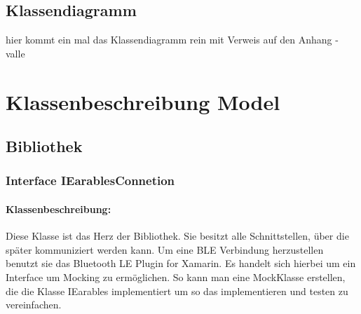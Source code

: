 \documentclass[a4paper,12pt]{article}
\begin{document}
  \subsection{Klassendiagramm}
hier kommt ein mal das Klassendiagramm rein mit Verweis auf den Anhang - valle
\clearpage
\section{Klassenbeschreibung Model}
\subsection{Bibliothek}
\subsubsection{Interface IEarablesConnetion}

\paragraph{Klassenbeschreibung:}
Diese Klasse ist das Herz der Bibliothek. Sie besitzt alle Schnittstellen, über die später kommuniziert werden kann. Um eine BLE Verbindung herzustellen benutzt sie das Bluetooth LE Plugin for Xamarin. Es handelt sich hierbei um ein Interface um Mocking zu ermöglichen. So kann man eine MockKlasse erstellen, die die Klasse IEarables implementiert um so das implementieren und testen zu vereinfachen.
\end{document}
